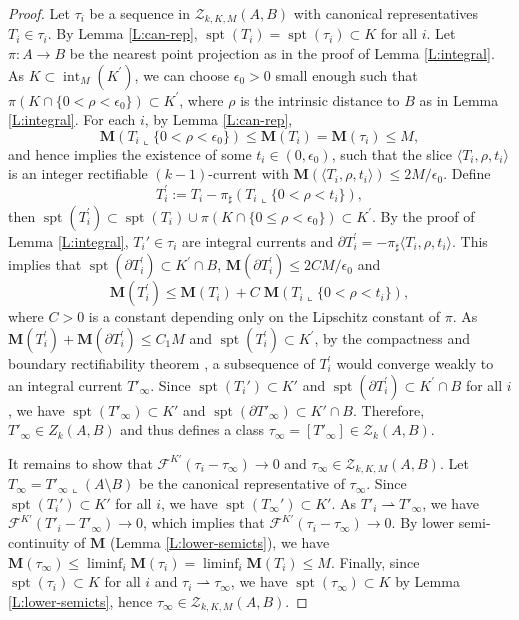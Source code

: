 \documentclass[10pt]{amsart}
\theoremstyle{definition}
\theoremstyle{remark}
\numberwithin{equation}{section}
\newcommand{\F}{\mathcal{F}}
\newcommand{\lan}{\langle}
\newcommand{\ran}{\rangle}
\newcommand{\weakto}{\rightharpoonup}
\newcommand{\lc}{\llcorner}
\newcommand{\ep}{\epsilon}
\newcommand{\pr}{\prime}
\newcommand{\Z}{\mathcal{Z}}
\newcommand{\M}{\mathbf{M}}
\newcommand{\spt}{\operatorname{spt}}
\newcommand{\interior}{\operatorname{int}}
\begin{document}
\begin{proof}
Let $\tau_i$ be a sequence in $\Z_{k, K, M}(A, B)$ with canonical representatives $T_i \in \tau_i$. By Lemma \ref{L:can-rep}, $\spt(T_i)=\spt(\tau_i) \subset K$ for all $i$. Let $\pi:A \to B$ be the nearest point projection as in the proof of Lemma \ref{L:integral}. As $K\subset \interior_M(K^{\pr})$, we can choose $\ep_0>0$ small enough such that $\pi(K\cap\{0<\rho<\ep_0\})\subset K^{\pr}$, where $\rho$ is the intrinsic distance to $B$ as in Lemma \ref{L:integral}. For each $i$, by Lemma \ref{L:can-rep}, 
\[ \M(T_i\lc\{0<\rho<\ep_0\})\leq \M(T_i)=\M(\tau_i)\leq M,\]
and hence \cite[28.4 and 28.5]{Simon} implies the existence of some $t_i\in (0, \ep_0)$, such that the slice $\lan T_i, \rho, t_i \ran$ is an integer rectifiable $(k-1)$-current with $\M(\lan T_i, \rho, t_i \ran)\leq 2M/\ep_0$. Define 
\[ T_i^{\pr}:=T_i-{\pi}_{\sharp}(T_i\lc\{0<\rho<t_i\}),\]
then $\spt(T_i^{\pr})\subset \spt(T_i)\cup \pi (K\cap\{0\leq\rho<\ep_0\})\subset K^{\pr}$. By the proof of Lemma \ref{L:integral}, $T_i' \in \tau_i$ are integral currents and $\partial T_i^{\pr}=-{\pi}_{\sharp} \lan T_i, \rho, t_i \ran$. This implies that $\spt(\partial T_i^{\pr})\subset K^{\pr}\cap B$, $\M(\partial T_i^{\pr})\leq 2CM/\ep_0$ and
\begin{equation}
\label{E:M(T_i)}
\M(T_i^{\pr})\leq \M(T_i)+C \; \M(T_i\lc\{0<\rho<t_i\}),
\end{equation}
where $C>0$ is a constant depending only on the Lipschitz constant of $\pi$.
As $\M(T_i^{\pr})+\M(\partial T_i^{\pr})\leq C_1 M$ and $\spt(T_i^{\pr})\subset K^{\pr}$, by the compactness and boundary rectifiability theorem \cite[27.3 and 30.3]{Simon}, a subsequence of $T_i^{\pr}$ would converge weakly to an integral current $T'_{\infty}$. Since $\spt(T_i') \subset K'$ and $\spt(\partial T_i^{\pr})\subset K^{\pr}\cap B$ for all $i$, we have $\spt (T'_{\infty}) \subset K'$ and $\spt(\partial T'_{\infty}) \subset K' \cap B$. Therefore, $T'_\infty \in Z_k(A,B)$ and thus defines a class $\tau_\infty =[T'_\infty] \in \Z_k(A,B)$. 

It remains to show that $\F^{K'}(\tau_i -\tau_\infty) \to 0$ and $\tau_\infty \in \Z_{k,K,M}(A,B)$. Let $T_\infty=T'_\infty \lc (A\setminus B)$ be the canonical representative of $\tau_\infty$. Since $\spt(T_i') \subset K'$ for all $i$, we have $\spt(T_\infty') \subset K'$. As $T'_i \weakto T'_\infty$, we have $\F^{K'}(T'_i-T'_\infty) \to 0$, which implies that $\F^{K'}(\tau_i -\tau_\infty) \to 0$. 
By lower semi-continuity of $\M$ (Lemma \ref{L:lower-semicts}), we have $\M(\tau_\infty) \leq \liminf_i  \M(\tau_i) = \liminf_i \M(T_i) \leq M$.
Finally, since $\spt(\tau_i) \subset K$ for all $i$ and $\tau_i \weakto \tau_\infty$, we have $\spt(\tau_\infty) \subset K$ by Lemma \ref{L:lower-semicts}, hence $\tau_{\infty} \in\Z_{k, K, M}(A,B)$.
\end{proof}
\end{document}
